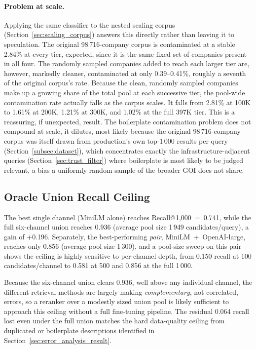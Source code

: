 \documentclass[a4paper,oneside,bibliography=totoc]{scrbook}
\begin{document}
\paragraph{Problem at scale.} Applying the same classifier to the nested scaling corpus (Section~\ref{sec:scaling_corpus}) answers this directly rather than leaving it to speculation. The original 98\,716-company corpus is contaminated at a stable 2.84\% at every tier, expected, since it is the same fixed set of companies present in all four. The randomly sampled companies added to reach each larger tier are, however, markedly cleaner, contaminated at only 0.39--0.41\%, roughly a seventh of the original corpus's rate. Because the clean, randomly sampled companies make up a growing share of the total pool at each successive tier, the pool-wide contamination rate actually falls as the corpus scales. It falls from 2.81\% at 100K to 1.61\% at 200K, 1.21\% at 300K, and 1.02\% at the full 397K tier. This is a reassuring, if unexpected, result. The boilerplate contamination problem does not compound at scale, it dilutes, most likely because the original 98\,716-company corpus was itself drawn from production's own top-1\,000 results per query (Section~\ref{subsec:dataset}), which concentrates exactly the infrastructure-adjacent queries (Section~\ref{sec:trust_filter}) where boilerplate is most likely to be judged relevant, a bias a uniformly random sample of the broader GOI does not share.

\subsection{Oracle Union Recall Ceiling}
\label{sec:oracle_union_result}

The best single channel (MiniLM alone) reaches Recall@1{,}000~=~0.741, while the full six-channel union reaches 0.936 (average pool size 1\,949 candidates/query), a gain of +0.196. Separately, the best-performing \emph{pair}, MiniLM~+~OpenAI-large, reaches only 0.856 (average pool size 1\,300), and a pool-size sweep on this pair shows the ceiling is highly sensitive to per-channel depth, from 0.150 recall at 100 candidates/channel to 0.581 at 500 and 0.856 at the full 1\,000.

Because the six-channel union clears 0.936, well above any individual channel, the different retrieval methods are largely making \emph{complementary}, not correlated, errors, so a reranker over a modestly sized union pool is likely sufficient to approach this ceiling without a full fine-tuning pipeline. The residual 0.064 recall lost even under the full union matches the hard data-quality ceiling from duplicated or boilerplate descriptions identified in Section~\ref{sec:error_analysis_result}.
\end{document}
